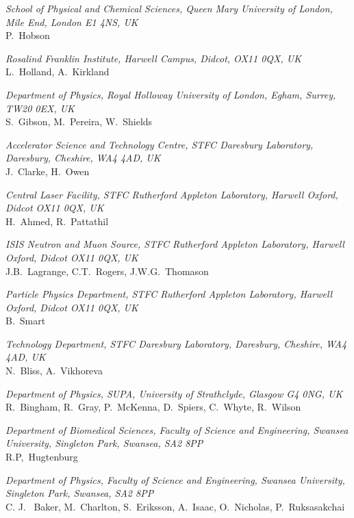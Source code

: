 \vspace{0.5cm}
\noindent \textit{School of Physical and Chemical Sciences, Queen Mary University of London, Mile End, London E1 4NS, UK} \\
P.~Hobson
 
\vspace{0.5cm}
\noindent \textit{Rosalind Franklin Institute, Harwell Campus, Didcot, OX11 0QX, UK} \\
L.~Holland, A.~Kirkland
 
\vspace{0.5cm}
\noindent \textit{Department of Physics, Royal Holloway University of London, Egham, Surrey, TW20 0EX, UK} \\
S.~Gibson, M.~Pereira, W.~Shields
 
\vspace{0.5cm}
\noindent \textit{Accelerator Science and Technology Centre, STFC Daresbury Laboratory, Daresbury, Cheshire, WA4 4AD, UK} \\
J.~Clarke, H.~Owen
 
\vspace{0.5cm}
\noindent \textit{Central Laser Facility, STFC Rutherford Appleton Laboratory, Harwell Oxford, Didcot OX11 0QX, UK} \\
H.~Ahmed, R.~Pattathil
 
\vspace{0.5cm}
\noindent \textit{ISIS Neutron and Muon Source, STFC Rutherford Appleton Laboratory, Harwell Oxford, Didcot OX11 0QX, UK} \\
J.B.~Lagrange, C.T.~Rogers, J.W.G.~Thomason
 
\vspace{0.5cm}
\noindent \textit{Particle Physics Department, STFC Rutherford Appleton Laboratory, Harwell Oxford, Didcot OX11 0QX, UK} \\
B.~Smart
 
\vspace{0.5cm}
\noindent \textit{Technology Department, STFC Daresbury Laboratory, Daresbury, Cheshire, WA4 4AD, UK} \\
N.~Bliss, A.~Vikhoreva
 
\vspace{0.5cm}
\noindent \textit{Department of Physics, SUPA, University of Strathclyde, Glasgow G4 0NG, UK} \\
R.~Bingham, R.~Gray, P.~McKenna, D.~Spiers, C.~Whyte, R.~Wilson
 
\vspace{0.5cm}
\noindent \textit{Department of Biomedical Sciences, Faculty of Science and Engineering, Swansea University, Singleton Park, Swansea, SA2 8PP} \\
R.P,~Hugtenburg
 
\vspace{0.5cm}
\noindent \textit{Department of Physics, Faculty of Science and Engineering, Swansea University, Singleton Park, Swansea, SA2 8PP} \\
C. J. ~Baker, M.~Charlton, S.~Eriksson, A.~Isaac, O.~Nicholas, P.~Ruksasakchai
 
\vspace{0.5cm}
